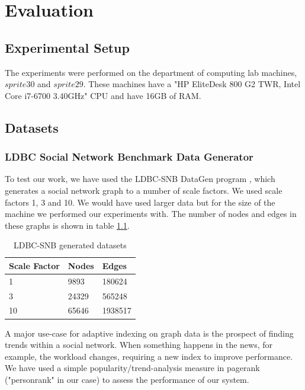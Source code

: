 \chapter{Evaluation}

\label{ch:evaluation}

\section{Experimental Setup}

The experiments were performed on the department of computing lab machines, $sprite30$ and $sprite29$. These machines have a "HP EliteDesk 800 G2 TWR, Intel Core i7-6700 3.40GHz" CPU and have 16GB of RAM.

\section{Datasets}

\subsection{LDBC Social Network Benchmark Data Generator}

To test our work, we have used the LDBC-SNB DataGen program \cite{Erling:2015:LSN:2723372.2742786}, which generates a social network graph to a number of scale factors. We used scale factors 1, 3 and 10. We would have used larger data but for the size of the machine we performed our experiments with. The number of nodes and edges in these graphs is shown in table \ref{tab:datasets_table}.

\begin{table}[H]
    \centering
    \begin{tabular}{| l | l | l |}
    \hline
    Scale Factor & Nodes & Edges \\ \hline
    1 & 9893 & 180624 \\ \hline
    3 & 24329 & 565248 \\ \hline
    10 & 65646 & 1938517 \\
    \hline
    \end{tabular}
    \caption{LDBC-SNB generated datasets}
    \label{tab:datasets_table}
\end{table}

A major use-case for adaptive indexing on graph data is the prospect of finding trends within a social network. When something happens in the news, for example, the workload changes, requiring a new index to improve performance. We have used a simple popularity/trend-analysis measure in pagerank ("personrank" in our case) to assess the performance of our system.

